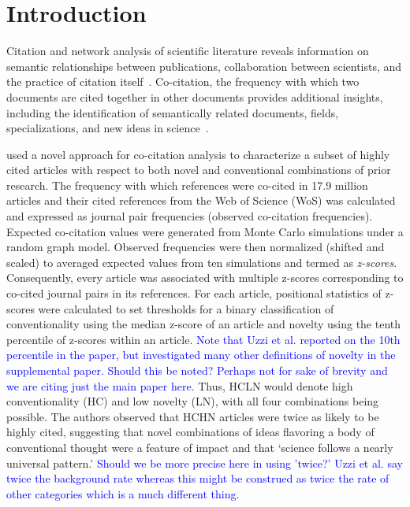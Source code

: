 \documentclass[NETN]{stjour}
\begin{document}
\section{Introduction}

Citation and network analysis of  scientific literature reveals information on semantic relationships between publications, collaboration between scientists, and the practice of citation itself~\citep{garfield_citation_1955,de_solla_price_networks_1965,newman_structure_2001,Shi:2010:CHI:1816123.1816131,patience_pmid28560354}. Co-citation, the frequency with which two documents are cited together in other documents provides additional insights, including the identification of semantically related documents, fields, specializations, and new ideas in science~\citep{small_co-citation_1973, marshakova-shaikevich_co-citation_1973,boyack_co-citation_2010, 10.3389/frma.2018.00020}. 

\cite{uzzi_atypical_2013} used a novel approach for co-citation analysis to characterize a subset of highly cited articles with respect to both novel and conventional combinations of prior research. The frequency with which references were co-cited  in 17.9 million articles and their cited references from the Web of Science (WoS) was calculated and expressed as journal pair frequencies (observed co-citation frequencies). Expected co-citation values were generated from Monte Carlo simulations under a random graph model. Observed frequencies were then normalized (shifted and scaled) to averaged expected values from ten simulations and termed as \emph{z-scores}. Consequently, every article was associated with multiple z-scores corresponding to co-cited journal pairs in its references. For each article, positional statistics of z-scores were calculated to set thresholds for a binary classification of conventionality using the median z-score of an article and novelty using the tenth percentile of z-scores within an article. \textcolor{blue}{Note that Uzzi et al. reported on the 10th percentile in the paper, but investigated many other definitions of novelty in the supplemental paper.  Should this be noted? Perhaps not for sake of brevity and we are citing just the main paper here.} Thus, HCLN would denote high conventionality (HC) and low novelty (LN), with all four combinations being possible. The authors observed that HCHN articles were twice as likely to be highly cited, suggesting that novel combinations of ideas flavoring a body of conventional thought were a feature of impact and that `science follows a nearly universal pattern.' \textcolor{blue}{Should we be more precise here in using 'twice?'  Uzzi et al. say twice the background rate whereas this might be construed as twice the rate of other categories which is a much different thing.}
\end{document}
